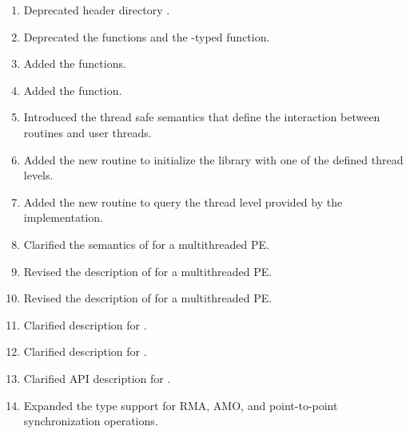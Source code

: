 \begin{enumerate}
%
%
\item Deprecated header directory .
%
%
\item Deprecated the  functions and the -typed \CorCpp {} function.
%
%
\item Added the  functions.
%
%
\item Added the  function.
%
%
\item Introduced the thread safe semantics that define the interaction between
    \openshmem routines and user threads.
%
%
\item Added the new routine  to initialize the
    \openshmem library with one of the defined thread levels.
%
%
\item Added the new routine  to query the thread
    level provided by the \openshmem implementation.
%
%
\item Clarified the semantics of  for a multithreaded
    \openshmem \ac{PE}.
%
%
\item Revised the description of  for a multithreaded
    \openshmem \ac{PE}.
%
%
\item Revised the description of  for a multithreaded
    \openshmem \ac{PE}.
%
%
\item Clarified description for .
%
%
\item Clarified description for .
%
%
\item Clarified \ac{API} description for .
%
%
\item Expanded the type support for \ac{RMA}, \ac{AMO}, and point-to-point
    synchronization operations.

\end{enumerate}
